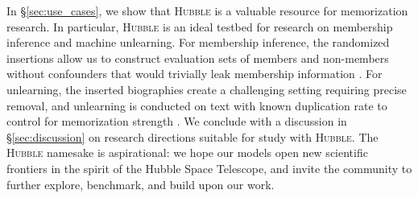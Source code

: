 \documentclass{article} %
\begin{document}
In \S\ref{sec:use_cases}, we show that \textsc{Hubble} is a valuable resource for memorization research. In particular, \textsc{Hubble} is an ideal testbed for research on membership inference and machine unlearning. For membership inference, the randomized insertions allow us to construct evaluation sets of members and non-members without confounders that would trivially leak membership information \citep{duan2024membershipinferenceattackswork}. For unlearning, the inserted biographies create a challenging setting requiring precise removal, and unlearning is conducted on text with known duplication rate to control for memorization strength \citep{krishnan2025dataunlearnedequally}. We conclude with a discussion in \S\ref{sec:discussion} on research directions suitable for study with \textsc{Hubble}. The \textsc{Hubble} namesake is aspirational: we hope our models open new scientific frontiers in the spirit of the Hubble Space Telescope, and invite the community to further explore, benchmark, and build upon our work.





\end{document}
